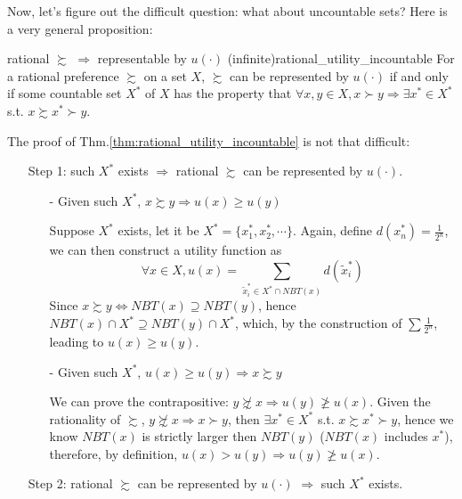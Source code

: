 Now, let's figure out the difficult question: what about uncountable sets? Here is a very general proposition:
\begin{theorem}{rational $\succsim$ $\Rightarrow$ representable by $u(\cdot)$ (infinite)}{rational_utility_incountable}
    For a rational preference $\succsim$ on a set $X$, $\succsim$ can be represented by $u(\cdot)$ if and only if some countable set $X^*$ of $X$ has the property that $\forall x,y\in X, x\succ y\Rightarrow \exists x^*\in X^*$ s.t. $x\succsim x^*\succ y$.
\end{theorem}
The proof of Thm.\ref{thm:rational_utility_incountable} is not that difficult:
\begin{enumerate}
    \item[Step 1:] such $X^*$ exists $\Rightarrow$ rational $\succsim$ can be represented by $u(\cdot)$.
    \begin{enumerate}
        \item[-]Given such $X^*$, $x\succsim y\Rightarrow u(x)\geq u(y)$
        
        Suppose $X^*$ exists, let it be $X^*=\{x_1^*,x_2^*,\cdots\}$. Again, define $d(x_n^*)=\frac{1}{2^n}$, we can then construct a utility function as 
        $$\forall x\in X, u(x)=\sum_{\tilde{x}_i^*\in X^*\cap NBT(x)}d(\tilde{x}^*_i)$$
        Since $x\succsim y\Leftrightarrow NBT(x)\supseteq NBT(y)$, hence $NBT(x)\cap X^*\supseteq NBT(y)\cap X^*$, which, by the construction of $\sum\frac{1}{2^n}$, leading to $u(x)\geq u(y)$.

        \item[-] Given such $X^*$, $u(x)\geq u(y)\Rightarrow x\succsim y$
        
        We can prove the contrapositive: $ y\not\succsim x\Rightarrow u(y)\not\geq u(x)$. Given the rationality of $\succsim$, $y\not\succsim x \Rightarrow x\succ y$, then $\exists x^*\in X^*$ s.t. $x\succsim x^* \succ y$, hence we know $NBT(x)$ is strictly larger then $NBT(y)$ ($NBT(x)$ includes $x^*$), therefore, by definition, $u(x)>u(y)\Rightarrow u(y)\not\geq u(x)$.
    \end{enumerate}
    
    \item[Step 2:] rational $\succsim$ can be represented by $u(\cdot)$ $\Rightarrow$ such $X^*$ exists.
    

\end{enumerate}
